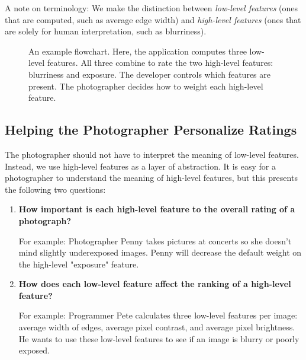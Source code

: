\documentclass[11pt,letter]{article}
\begin{document}
A note on terminology: We make the distinction between \textit{low-level features} (ones that are computed, such as average edge width) and \textit{high-level features} (ones that are solely for human interpretation, such as blurriness).

\begin{figure*}[b!]
  \centering
  \caption{An example flowchart. Here, the application computes three low-level features. All three combine to rate the two high-level features: blurriness and exposure. The developer controls which features are present. The photographer decides how to weight each high-level feature.}
  \label{fig:flowchart}
\end{figure*}

\subsection{Helping the Photographer Personalize Ratings}
\label{abstraction}
The photographer should not have to interpret the meaning of low-level features. Instead, we use high-level features as a layer of abstraction. It is easy for a photographer to understand the meaning of high-level features, but this presents the following two questions:

\begin{enumerate}
\item \textbf{How important is each high-level feature to the overall rating of a photograph?}


For example: Photographer Penny takes pictures at concerts so she doesn't mind slightly underexposed images. Penny will decrease the default weight on the high-level "exposure" feature.

\item \textbf{How does each low-level feature affect the ranking of a high-level feature?}


For example: Programmer Pete calculates three low-level features per image: average width of edges, average pixel contrast, and average pixel brightness. He wants to use these low-level features to see if an image is blurry or poorly exposed.
\end{enumerate}
\end{document}
